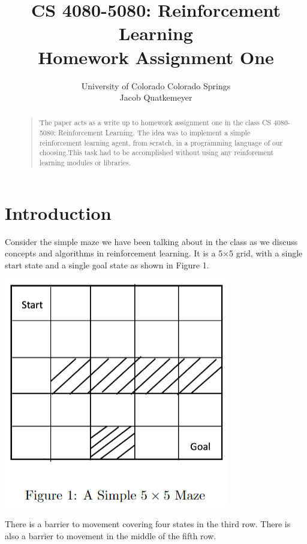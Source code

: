 \documentclass[letterpaper]{article}
\begin{document}
%
\title{CS 4080-5080: Reinforcement Learning\\Homework Assignment One}
\author{University of Colorado Colorado Springs\\Jacob Quatkemeyer
}
\maketitle
\begin{abstract}
\begin{quote}
The paper acts as a write up to homework assignment one in the class CS 4080-5080: Reinforcement Learning. The idea was to implement a simple reinforcement learning agent, from scratch,  in a programming language of our choosing.This task had to be accomplished without using any reinforement learning modules or libraries.
\end{quote}
\end{abstract}

\section{Introduction}
\noindent Consider  the  simple  maze  we  have  been  talking  about  in  the  class  as  we  discuss  concepts  and algorithms in reinforcement learning.  It is a 5×5 grid, with a single start state and a single goal state as shown in Figure 1.  

\includegraphics{figure_1}

There is a barrier to movement covering four states in the third row. There is also a barrier to movement in the middle of the fifth row.
\end{document}
